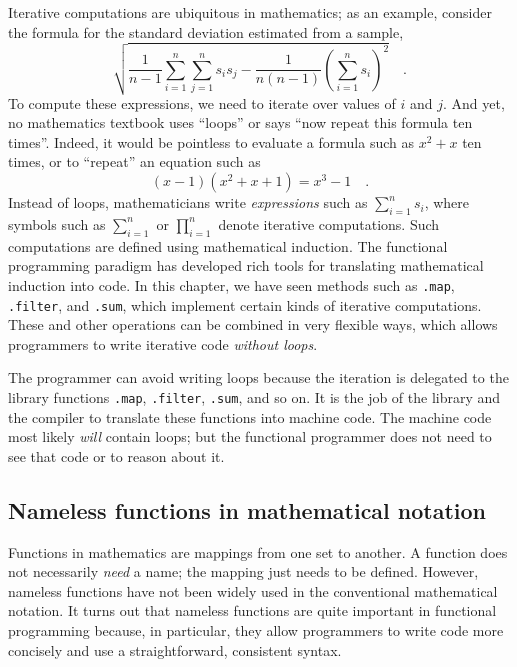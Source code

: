 Iterative computations are ubiquitous in mathematics; as an example,
consider the formula for the standard deviation estimated from a sample,
\[
\sqrt{\frac{1}{n-1}\sum_{i=1}^{n}\sum_{j=1}^{n}s_{i}s_{j}-\frac{1}{n\left(n-1\right)}\left(\sum_{i=1}^{n}s_{i}\right)^{2}}\quad.
\]
To compute these expressions, we need to iterate over values of $i$
and $j$. And yet, no mathematics textbook uses ``loops'' or says
``now repeat this formula ten times''. Indeed, it would be pointless
to evaluate a formula such as $x^{2}+x$ ten times, or to ``repeat''
an equation such as
\[
\left(x-1\right)(x^{2}+x+1)=x^{3}-1\quad.
\]
Instead of loops, mathematicians write \emph{expressions} such as
$\sum_{i=1}^{n}s_{i}$, where symbols such as $\sum_{i=1}^{n}$ or
$\prod_{i=1}^{n}$ denote iterative computations. Such computations
are defined using mathematical induction.
The functional programming paradigm has developed rich tools for translating
mathematical induction into code. In this chapter, we have seen methods
such as \lstinline!.map!,
\lstinline!.filter!, and
\lstinline!.sum!, which
implement certain kinds of iterative computations. These and other
operations can be combined in very flexible ways, which allows programmers
to write iterative code \emph{without loops}.

The programmer can avoid writing loops because the iteration is delegated
to the library functions \lstinline!.map!,
\lstinline!.filter!, \lstinline!.sum!,
and so on. It is the job of the library and the compiler to translate
these functions into machine code. The machine code most likely \emph{will}
contain loops; but the functional programmer does not need to see
that code or to reason about it.

\subsection{Nameless functions in mathematical notation\label{subsec:Nameless-functions-in-mathematical-notation}}

Functions in mathematics are mappings from one set to another. A function
does not necessarily \emph{need} a name; the mapping just needs to
be defined. However, nameless functions have not been widely used
in the conventional mathematical notation. It turns out that nameless
functions are quite important in functional programming because, in
particular, they allow programmers to write code more concisely and
use a straightforward, consistent syntax.

